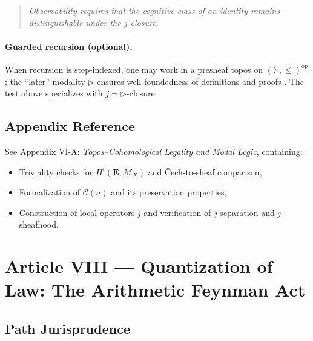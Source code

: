 \documentclass[12pt]{amsart}
\theoremstyle{plain}
\begin{document}
\begin{quote}
\textit{Observability requires that the cognitive class of an identity remains distinguishable under the $j$-closure.}
\end{quote}

\paragraph{Guarded recursion (optional).}
When recursion is step-indexed, one may work in a presheaf topos on $(\mathbb{N},\le)^{\mathrm{op}}$; the “later” modality $\triangleright$ ensures well-foundedness of definitions and proofs \cite{birkedal2013guarded}. The test above specializes with $j=\triangleright$-closure.

\subsection*{Appendix Reference}

See Appendix VI-A: \emph{Topos–Cohomological Legality and Modal Logic}, containing:
\begin{itemize}
  \item Triviality checks for $H^i(\mathbf{E},\mathscr{M}_X)$ and Čech-to-sheaf comparison,
  \item Formalization of $\mathcal{C}(n)$ and its preservation properties,
  \item Construction of local operators $j$ and verification of $j$-separation and $j$-sheafhood.
\end{itemize}
\section{Article VIII — Quantization of Law: The Arithmetic Feynman Act}

\subsection{Path Jurisprudence}
\end{document}
